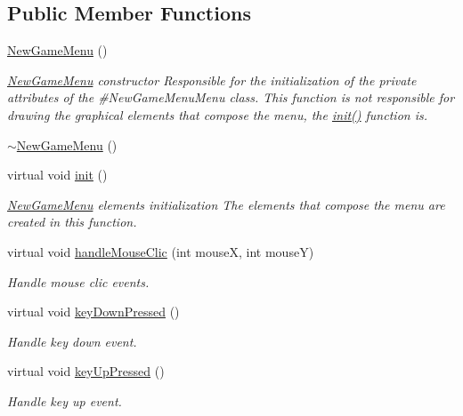 \subsection*{Public Member Functions}
\begin{DoxyCompactItemize}
\item 
\hyperlink{class_symp_1_1_new_game_menu_abcb925e95443d461c296bf37ef42cd76}{New\-Game\-Menu} ()
\begin{DoxyCompactList}\small\item\em \hyperlink{class_symp_1_1_new_game_menu}{New\-Game\-Menu} constructor Responsible for the initialization of the private attributes of the \#\-New\-Game\-Menu\-Menu class. This function is not responsible for drawing the graphical elements that compose the menu, the \hyperlink{class_symp_1_1_new_game_menu_a8f57888361e8424acedda26143fd7746}{init()} function is. \end{DoxyCompactList}\item 
\hyperlink{class_symp_1_1_new_game_menu_a0ae319dc01e3244e6bcf2c5aa73b85bf}{$\sim$\-New\-Game\-Menu} ()
\item 
virtual void \hyperlink{class_symp_1_1_new_game_menu_a8f57888361e8424acedda26143fd7746}{init} ()
\begin{DoxyCompactList}\small\item\em \hyperlink{class_symp_1_1_new_game_menu}{New\-Game\-Menu} elements initialization The elements that compose the menu are created in this function. \end{DoxyCompactList}\item 
virtual void \hyperlink{class_symp_1_1_new_game_menu_a2e02c1b26f7e221de7a4cae2e856a41c}{handle\-Mouse\-Clic} (int mouse\-X, int mouse\-Y)
\begin{DoxyCompactList}\small\item\em Handle mouse clic events. \end{DoxyCompactList}\item 
virtual void \hyperlink{class_symp_1_1_new_game_menu_a4c52d19b89c3122ca989c2149467cdd2}{key\-Down\-Pressed} ()
\begin{DoxyCompactList}\small\item\em Handle key down event. \end{DoxyCompactList}\item 
virtual void \hyperlink{class_symp_1_1_new_game_menu_abb3d59240c9874026dd996bc9fb9a290}{key\-Up\-Pressed} ()
\begin{DoxyCompactList}\small\item\em Handle key up event. \end{DoxyCompactList}\item 

\end{DoxyCompactItemize}
